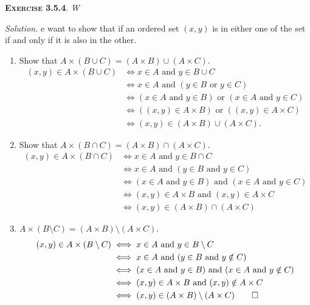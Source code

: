 \documentclass[12pt]{article}
\theoremstyle{remark}
\newenvironment{exer}[2]{
    \noindent \setlength{\parskip}{1em}%
    \textsc{\textbf{Exercise #1}}. \textit{#2} \par
    \noindent \textit{Solution.} %
}{\bigskip}
\begin{document}
\begin{exer}{3.5.4}
    We want to show that if an ordered set $(x, y)$ is in either one of the set if and only if it is also in the other.
    \begin{enumerate}[topsep=0mm,label=(\alph*)]
        \item Show that $A \times (B \cup C) = (A \times B) \cup (A \times C)$.
            \begin{align*}
                (x, y) \in A \times (B \cup C)
                & \iff x \in A \text{ and } y \in B \cup C \\
                & \iff x \in A \text{ and } (y \in B \text{ or } y \in C) \\
                & \iff (x \in A \text{ and } y \in B) \text{ or } (x \in A \text{ and } y \in C) \\
                & \iff ((x, y) \in A \times B) \text{ or } ((x, y) \in A \times C) \\
                & \iff (x, y) \in (A \times B) \cup (A \times C).
            \end{align*}
        \item Show that $A \times (B \cap C) = (A \times B) \cap (A \times C)$.
            \begin{align*}
                (x, y) \in A \times (B \cap C)
                & \iff x \in A \text{ and } y \in B \cap C \\
                & \iff x \in A \text{ and } (y \in B \text{ and } y \in C) \\
                & \iff (x \in A \text{ and } y \in B) \text{ and } (x \in A \text{ and } y \in C) \\
                & \iff (x, y) \in A \times B \text{ and } (x, y) \in A \times C \\
                & \iff (x, y) \in (A \times B) \cap (A \times C)
            \end{align*}
        \item $A \times (B \setminus C) = (A \times B) \setminus (A \times C)$.
            \begin{align*}
                (x, y) \in A \times (B \setminus C)
                & \iff x \in A \text{ and } y \in B \setminus C \\
                & \iff x \in A \text{ and } (y \in B \text{ and } y \notin C) \\
                & \iff (x \in A \text{ and } y \in B) \text{ and } (x \in A \text{ and } y \notin C) \\
                & \iff (x, y) \in A \times B \text{ and } (x, y) \notin A \times C \\
                & \iff (x, y) \in (A \times B) \setminus (A \times C) \qed
            \end{align*}
    \end{enumerate}
\end{exer}
\end{document}
